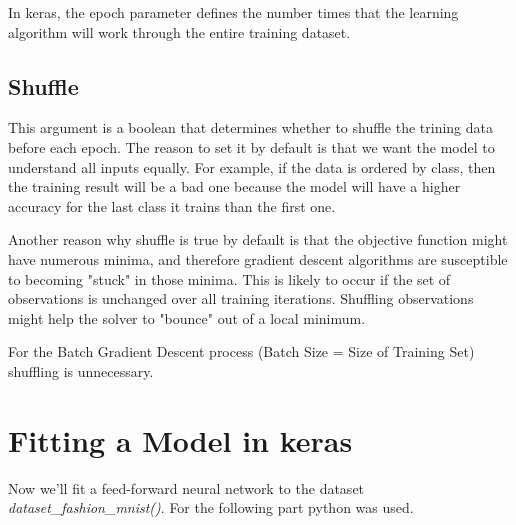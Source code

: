In keras, the epoch parameter defines the number times that the learning algorithm will work through the entire training dataset.

\subsection{Shuffle}
This argument is a boolean that determines whether to shuffle the trining data before each epoch. The reason to set it by default is that we want the model to understand all inputs equally. For example, if the data is ordered by class, then the training result will be a bad one because the model will have a higher accuracy for the last class it trains than the first one.

Another reason why shuffle is true by default is that the objective function might have numerous minima, and therefore gradient descent algorithms are susceptible to becoming "stuck" in those minima. This is likely to occur if the set of observations is unchanged over all training iterations. Shuffling observations might help the solver to "bounce" out of a local minimum.

For the Batch Gradient Descent process (Batch Size = Size of Training Set) shuffling is unnecessary.


\section{Fitting a Model in keras}

Now we'll fit a feed-forward neural network to the dataset \textit{dataset\_fashion\_mnist()}. For the following part python was used.

